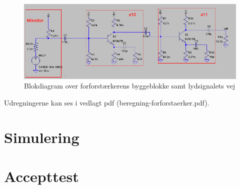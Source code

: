 \begin{figure}[h]
\centering
\includegraphics[scale=.6]{teknisk/forforstaerker/blok_forforstaerker.png}
\caption{Blokdiagram over forforstærkerens byggeblokke samt lydsignalets vej}
\label{blok_forforstaerker}
\end{figure}

Udregningerne kan ses i vedlagt pdf (beregning-forforstaerker.pdf). 


\section{Simulering}


\section{Accepttest}

